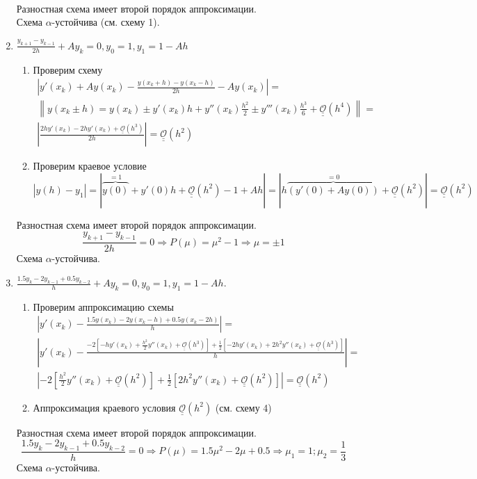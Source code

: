 \documentclass[12pt]{article}
\def\bigO{ \underline{\underline{\mathcal{O}}} }
\begin{document}
\begin{enumerate}
\begin{multline*}
    \end{multline*}
    Разностная схема имеет второй порядок аппроксимации. \\
    Схема $\alpha$-устойчива (см. схему 1).
    \item $\frac{y_{k+1} - y_{k-1}}{2h} + Ay_k = 0, y_0 = 1, y_1 = 1 - Ah$
    \begin{enumerate}
        \item Проверим схему
        \begin{multline*}
            \left|y'(x_k)+Ay(x_k)-\frac{y(x_k+h)-y(x_k-h)}{2h}-Ay(x_k)\right|=\\
            \left\|y(x_k\pm h)=y(x_k)\pm y'(x_k)h + y''(x_k)\frac{h^2}{2}\pm y'''(x_k)\frac{h^3}{6}+\bigO(h^4)\right\| = \\
            \left|\frac{2hy'(x_k)-2hy'(x_k)+\bigO(h^3)}{2h}\right| = \bigO(h^2)
        \end{multline*}
        \item Проверим краевое условие
        \[|y(h)-y_1|=|\overbrace{y(0)}^{=1}+y'(0)h+\bigO(h^2)-1+Ah|=|h\overbrace{(y'(0)+Ay(0))}^{=0}+\bigO(h^2)|=\bigO(h^2)\]
    \end{enumerate}
    Разностная схема имеет второй порядок аппроксимации.
    \[\frac{y_{k+1}-y_{k-1}}{2h}=0\Rightarrow P(\mu)=\mu^2-1\Rightarrow \mu=\pm 1\]
    Схема $\alpha$-устойчива.
    \item $\frac{1.5y_{k} - 2y_{k-1} + 0.5y_{k-2}}{h}+Ay_k= 0, y_0 = 1, y_1 = 1 - Ah.$
    \begin{enumerate}
        \item Проверим аппроксимацию схемы
        \begin{multline*}
            \left|y'(x_k)-\frac{1.5y(x_k)-2y(x_k-h)+0.5y(x_k-2h)}{h}\right|=\\
            \left|y'(x_k)-\frac{-2\left[-hy'(x_k)+\frac{h^2}{2}y''(x_k)+\bigO(h^3)\right]+\frac{1}{2}\left[-2hy'(x_k)+2h^2y''(x_k)+\bigO(h^3)\right]}{h}\right|=\\
            \left|-2\left[\frac{h^2}{2}y''(x_k)+\bigO(h^2)\right]+\frac{1}{2}\left[2h^2y''(x_k)+\bigO(h^2)\right]\right|=\bigO(h^2)
        \end{multline*}
        \item Аппроксимация краевого условия $\bigO(h^2)$ (см. схему 4)
    \end{enumerate}
    Разностная схема имеет второй порядок аппроксимации.
    \[\frac{1.5y_k-2y_{k-1}+0.5y_{k-2}}{h}=0\Rightarrow P(\mu)=1.5\mu^2-2\mu+0.5\Rightarrow\mu_1=1;\mu_2=\frac{1}{3}\]
    Схема $\alpha$-устойчива.

\end{enumerate}
\end{document}
